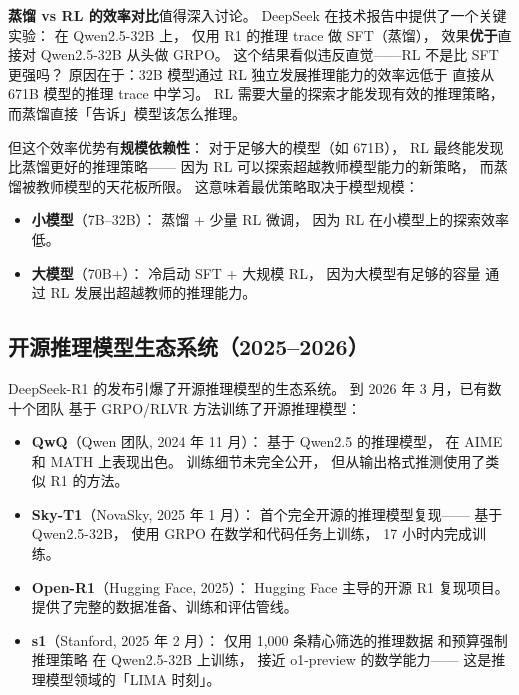 \textbf{蒸馏 vs RL 的效率对比}值得深入讨论。
DeepSeek 在技术报告中提供了一个关键实验：
在 Qwen2.5-32B 上，
仅用 R1 的推理 trace 做 SFT（蒸馏），
效果\textbf{优于}直接对 Qwen2.5-32B 从头做 GRPO。
这个结果看似违反直觉——RL 不是比 SFT 更强吗？
原因在于：32B 模型通过 RL 独立发展推理能力的效率远低于
直接从 671B 模型的推理 trace 中学习。
RL 需要大量的探索才能发现有效的推理策略，
而蒸馏直接「告诉」模型该怎么推理。

但这个效率优势有\textbf{规模依赖性}：
对于足够大的模型（如 671B），
RL 最终能发现比蒸馏更好的推理策略——
因为 RL 可以探索超越教师模型能力的新策略，
而蒸馏被教师模型的天花板所限。
这意味着最优策略取决于模型规模：
\begin{itemize}[noitemsep]
  \item \textbf{小模型}（7B--32B）：
        蒸馏 + 少量 RL 微调，
        因为 RL 在小模型上的探索效率低。
  \item \textbf{大模型}（70B+）：
        冷启动 SFT + 大规模 RL，
        因为大模型有足够的容量
        通过 RL 发展出超越教师的推理能力。
\end{itemize}

\subsection{开源推理模型生态系统（2025--2026）}

DeepSeek-R1 的发布引爆了开源推理模型的生态系统。
到 2026 年 3 月，已有数十个团队
基于 GRPO/RLVR 方法训练了开源推理模型：

\begin{itemize}[noitemsep]
  \item \textbf{QwQ}（Qwen 团队, 2024 年 11 月）：
        基于 Qwen2.5 的推理模型，
        在 AIME 和 MATH 上表现出色。
        训练细节未完全公开，
        但从输出格式推测使用了类似 R1 的方法。
  \item \textbf{Sky-T1}（NovaSky, 2025 年 1 月）：
        首个完全开源的推理模型复现——
        基于 Qwen2.5-32B，
        使用 GRPO 在数学和代码任务上训练，
        17 小时内完成训练。
  \item \textbf{Open-R1}（Hugging Face, 2025）：
        Hugging Face 主导的开源 R1 复现项目。
        提供了完整的数据准备、训练和评估管线。
  \item \textbf{s1}（Stanford, 2025 年 2 月）：
        仅用 1,000 条精心筛选的推理数据
        和预算强制推理策略
        在 Qwen2.5-32B 上训练，
        接近 o1-preview 的数学能力——
        这是推理模型领域的「LIMA 时刻」。
\end{itemize}

